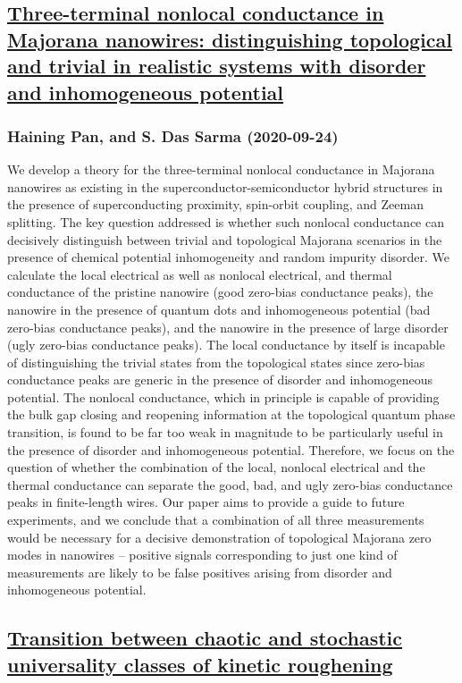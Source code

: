 \subsection*{\href{http://arxiv.org/abs/2009.11809v1}{Three-terminal nonlocal conductance in Majorana nanowires:  distinguishing topological and trivial in realistic systems with disorder and  inhomogeneous potential}}
\subsubsection*{Haining Pan, and S. Das Sarma (2020-09-24)}
We develop a theory for the three-terminal nonlocal conductance in Majorana
nanowires as existing in the superconductor-semiconductor hybrid structures in
the presence of superconducting proximity, spin-orbit coupling, and Zeeman
splitting. The key question addressed is whether such nonlocal conductance can
decisively distinguish between trivial and topological Majorana scenarios in
the presence of chemical potential inhomogeneity and random impurity disorder.
We calculate the local electrical as well as nonlocal electrical, and thermal
conductance of the pristine nanowire (good zero-bias conductance peaks), the
nanowire in the presence of quantum dots and inhomogeneous potential (bad
zero-bias conductance peaks), and the nanowire in the presence of large
disorder (ugly zero-bias conductance peaks). The local conductance by itself is
incapable of distinguishing the trivial states from the topological states
since zero-bias conductance peaks are generic in the presence of disorder and
inhomogeneous potential. The nonlocal conductance, which in principle is
capable of providing the bulk gap closing and reopening information at the
topological quantum phase transition, is found to be far too weak in magnitude
to be particularly useful in the presence of disorder and inhomogeneous
potential. Therefore, we focus on the question of whether the combination of
the local, nonlocal electrical and the thermal conductance can separate the
good, bad, and ugly zero-bias conductance peaks in finite-length wires. Our
paper aims to provide a guide to future experiments, and we conclude that a
combination of all three measurements would be necessary for a decisive
demonstration of topological Majorana zero modes in nanowires -- positive
signals corresponding to just one kind of measurements are likely to be false
positives arising from disorder and inhomogeneous potential.

\subsection*{\href{http://arxiv.org/abs/2009.11804v1}{Transition between chaotic and stochastic universality classes of  kinetic roughening}}
